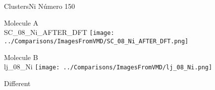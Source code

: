  \newpage

\vtab[-3cm]
\begin{center}
{\large ClustersNi \tab Número 150}
\end{center}
\begin{multicols}{2}
\begin{center}
Molecule A \\ 
SC\_08\_Ni\_AFTER\_DFT
\texttt{[image: ../Comparisons/ImagesFromVMD/SC\_08\_Ni\_AFTER\_DFT.png]}
\\
\vtab

\columnbreak
Molecule B \\ 
lj\_08\_Ni
\texttt{[image: ../Comparisons/ImagesFromVMD/lj\_08\_Ni.png]}
\\
\vtab


\end{center}
\end{multicols}
\begin{center}
\textcolor{NavyBlue}{\Large Different}
\end{center}

 \newpage

